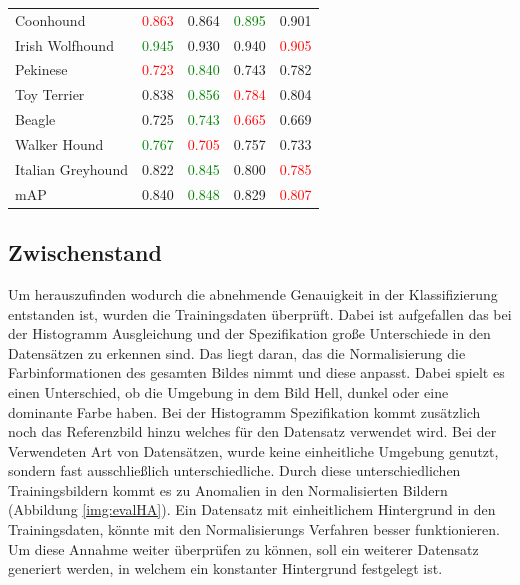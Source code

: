 \documentclass[a4paper,12pt,oneside]{article}
\begin{document}
\begin{table}
\begin{tabular}{|l|c|c|c|c|}
Coonhound & \textcolor{red}{0.863} & 0.864 & \textcolor{green}{0.895} & 0.901\\
Irish Wolfhound & \textcolor{green}{0.945} & 0.930 & 0.940 & \textcolor{red}{0.905}\\
Pekinese & \textcolor{red}{0.723} & \textcolor{green}{0.840} & 0.743 & 0.782\\
Toy Terrier & 0.838 & \textcolor{green}{0.856} & \textcolor{red}{0.784} & 0.804\\
Beagle & 0.725 & \textcolor{green}{0.743} & \textcolor{red}{0.665} & 0.669\\
Walker Hound & \textcolor{green}{0.767} & \textcolor{red}{0.705} & 0.757 & 0.733\\
Italian Greyhound & 0.822 & \textcolor{green}{0.845} & 0.800 & \textcolor{red}{0.785}\\
\hline
mAP & 0.840 & \textcolor{green}{0.848} & 0.829 & \textcolor{red}{0.807}\\
\hline
\end{tabular}
\end{table}
\subsection{Zwischenstand}
Um herauszufinden wodurch die abnehmende Genauigkeit in der Klassifizierung entstanden ist, wurden die Trainingsdaten überprüft. Dabei ist aufgefallen das bei der Histogramm Ausgleichung und der Spezifikation große Unterschiede in den Datensätzen zu erkennen sind. Das liegt daran, das die Normalisierung die Farbinformationen des gesamten Bildes nimmt und diese anpasst. Dabei spielt es einen Unterschied, ob die Umgebung in dem Bild Hell, dunkel oder eine dominante Farbe haben. Bei der Histogramm Spezifikation kommt zusätzlich noch das Referenzbild hinzu welches für den Datensatz verwendet wird. Bei der Verwendeten Art von Datensätzen, wurde keine einheitliche Umgebung genutzt, sondern fast ausschließlich unterschiedliche. Durch diese unterschiedlichen Trainingsbildern kommt es zu Anomalien in den Normalisierten Bildern (Abbildung \ref{img:evalHA}). Ein Datensatz mit einheitlichem Hintergrund in den Trainingsdaten, könnte mit den Normalisierungs Verfahren besser funktionieren. Um diese Annahme weiter überprüfen zu können, soll ein weiterer Datensatz generiert werden, in welchem ein konstanter Hintergrund festgelegt ist.
\end{document}
